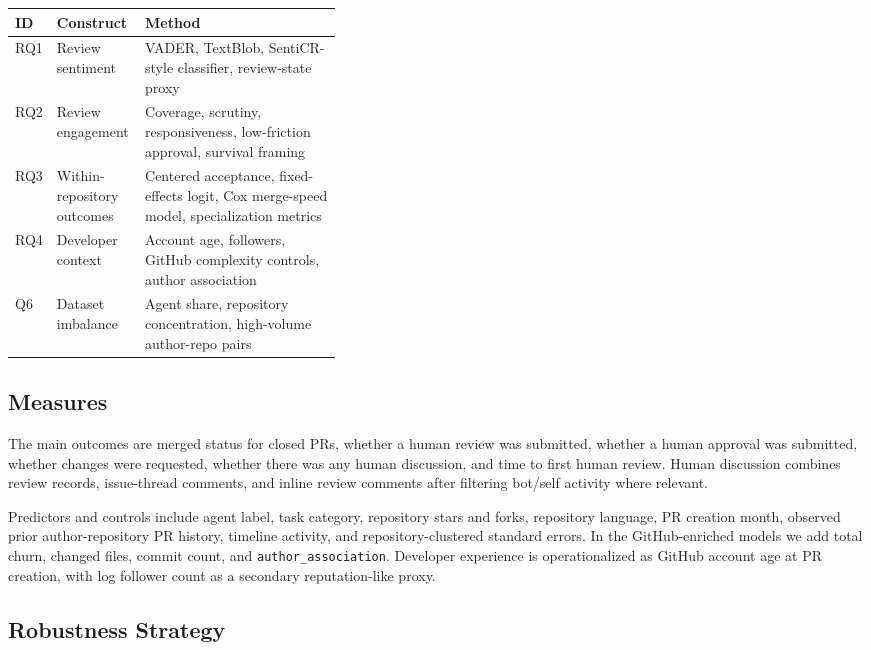 \documentclass[sigconf,nonacm]{acmart}
\begin{document}
\begin{center}
\label{tab:rq-methods}
\small
\begin{tabularx}{\linewidth}{>{\raggedright\arraybackslash}p{0.11\linewidth}>{\raggedright\arraybackslash}p{0.27\linewidth}X}
\toprule
ID & Construct & Method \\
\midrule
RQ1 & Review sentiment & VADER, TextBlob, SentiCR-style classifier, review-state proxy \\
RQ2 & Review engagement & Coverage, scrutiny, responsiveness, low-friction approval, survival framing \\
RQ3 & Within-repository outcomes & Centered acceptance, fixed-effects logit, Cox merge-speed model, specialization metrics \\
RQ4 & Developer context & Account age, followers, GitHub complexity controls, author association \\
Q6 & Dataset imbalance & Agent share, repository concentration, high-volume author-repo pairs \\
\bottomrule
\end{tabularx}
\end{center}

\subsection{Measures}

The main outcomes are merged status for closed PRs, whether a human review was submitted, whether a human approval was submitted, whether changes were requested, whether there was any human discussion, and time to first human review. Human discussion combines review records, issue-thread comments, and inline review comments after filtering bot/self activity where relevant.

Predictors and controls include agent label, task category, repository stars and forks, repository language, PR creation month, observed prior author-repository PR history, timeline activity, and repository-clustered standard errors. In the GitHub-enriched models we add total churn, changed files, commit count, and \newline \texttt{author\_association}. Developer experience is operationalized as GitHub account age at PR creation, with log follower count as a secondary reputation-like proxy.

\subsection{Robustness Strategy}
\end{document}
